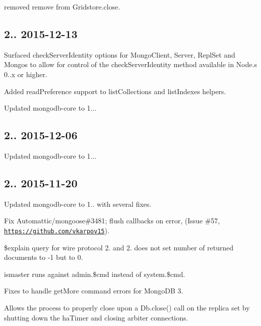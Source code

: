 \begin{DoxyItemize}
\item removed remove from Gridstore.\+close.
\end{DoxyItemize}

\subsection*{2.. 2015-\/12-\/13 }


\begin{DoxyItemize}
\item Surfaced check\+Server\+Identity options for Mongo\+Client, Server, Repl\+Set and Mongos to allow for control of the check\+Server\+Identity method available in Node.\+s 0..\+x or higher.
\item Added read\+Preference support to list\+Collections and list\+Indexes helpers.
\item Updated mongodb-\/core to 1...
\end{DoxyItemize}

\subsection*{2.. 2015-\/12-\/06 }


\begin{DoxyItemize}
\item Updated mongodb-\/core to 1...
\end{DoxyItemize}

\subsection*{2.. 2015-\/11-\/20 }


\begin{DoxyItemize}
\item Updated mongodb-\/core to 1.. with several fixes.
\begin{DoxyItemize}
\item Fix Automattic/mongoose\#3481; flush callbacks on error, (Issue \#57, \href{https://github.com/vkarpov15}{\tt https\+://github.\+com/vkarpov15}).
\item \$explain query for wire protocol 2. and 2. does not set number of returned documents to -\/1 but to 0.
\item ismaster runs against admin.\$cmd instead of system.\$cmd.
\item Fixes to handle get\+More command errors for Mongo\+DB 3.
\item Allows the process to properly close upon a Db.\+close() call on the replica set by shutting down the ha\+Timer and closing arbiter connections.
\end{DoxyItemize}
\end{DoxyItemize}

